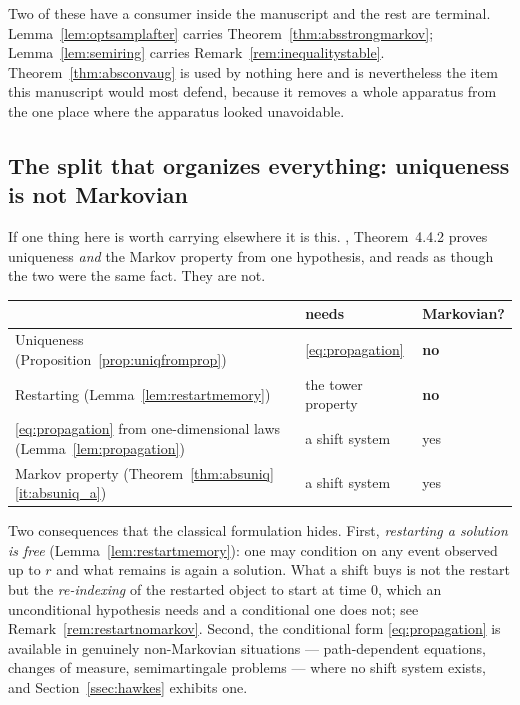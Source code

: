 \documentclass[11pt,a4paper]{article}
\theoremstyle{plain}
\theoremstyle{definition}
\theoremstyle{remark}
\newcommand{\EK}{\cite{EK86}}
\begin{document}
\medskip
\noindent
Two of these have a consumer inside the manuscript and the rest are terminal.
Lemma~\ref{lem:optsamplafter} carries Theorem~\ref{thm:absstrongmarkov};
Lemma~\ref{lem:semiring} carries Remark~\ref{rem:inequalitystable}.
Theorem~\ref{thm:absconvaug} is used by nothing here and is nevertheless the
item this manuscript would most defend, because it removes a whole apparatus
from the one place where the apparatus looked unavoidable.

\subsection{The split that organizes everything: uniqueness is not Markovian}
\label{ssec:addedsplit}

If one thing here is worth carrying elsewhere it is this.  \EK, Theorem~4.4.2
proves uniqueness \emph{and} the Markov property from one hypothesis, and reads
as though the two were the same fact.  They are not.

\medskip
\noindent
\begin{tabular}{@{}p{}p{}l@{}}
\toprule
& \textbf{needs} & \textbf{Markovian?} \\
\midrule
Uniqueness (Proposition~\ref{prop:uniqfromprop})
  & \eqref{eq:propagation} & \textbf{no} \\
Restarting (Lemma~\ref{lem:restartmemory})
  & the tower property & \textbf{no} \\
\eqref{eq:propagation} from one-dimensional laws
  (Lemma~\ref{lem:propagation})
  & a shift system & yes \\
Markov property (Theorem~\ref{thm:absuniq}\ref{it:absuniq_a})
  & a shift system & yes \\
\bottomrule
\end{tabular}

\medskip
\noindent
Two consequences that the classical formulation hides.  First, \emph{restarting
a solution is free} (Lemma~\ref{lem:restartmemory}): one may condition on any
event observed up to $r$ and what remains is again a solution.  What a shift
buys is not the restart but the \emph{re-indexing} of the restarted object to
start at time $0$, which an unconditional hypothesis needs and a conditional one
does not; see Remark~\ref{rem:restartnomarkov}.  Second, the conditional form
\eqref{eq:propagation} is available in genuinely non-Markovian situations ---
path-dependent equations, changes of measure, semimartingale problems --- where
no shift system exists, and Section~\ref{ssec:hawkes} exhibits one.
\end{document}
